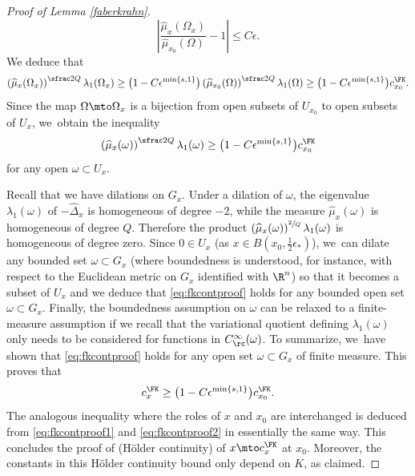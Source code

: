 \begin{proof}[Proof of Lemma \ref{faberkrahn}]
\begin{equation}
\label{eq:fkcontproof2}
\left| \frac{\widehat\mu_x(\Omega_x)}{\widehat\mu_{x_0}(\Omega)} - 1\right| \leq C \epsilon.
\end{equation}
We deduce that
\[
\left(\widehat\mu_x(\Omega_x)\right)^{\sfrac2Q} \lambda_1(\Omega_x)
\geq \bigl(1- C \epsilon^{\min\{s,1\}}\bigr) \left(\widehat\mu_{x_0}(\Omega)\right)^{\sfrac2Q} \lambda_1(\Omega) \geq \bigl(1- C \epsilon^{\min\{s,1\}}\bigr) c^\FK_{x_0}.
\]
Since the map $\Omega\mto\Omega_x$ is a bijection from open subsets of $U_{x_0}$ to open subsets of $U_x$, we~obtain the inequality
\begin{equation}
\label{eq:fkcontproof}
\left(\widehat\mu_x(\omega)\right)^{\sfrac2Q} \lambda_1(\omega)
\geq \bigl(1- C \epsilon^{\min\{s,1\}} \bigr) c^\FK_{x_0}
\end{equation}
for any open $\omega\subset U_x$.

Recall that we have dilations on $G_x$. Under a dilation of $\omega$, the eigenvalue $\lambda_1(\omega)$ of $-\widehat\Delta_x$ is homogeneous of degree $-2$, while the measure $\widehat\mu_x(\omega)$ is homogeneous of degree $Q$. Therefore the product $\left(\widehat\mu_x(\omega)\right)^{\sfrac2Q} \lambda_1(\omega)$ is homogeneous of degree zero. Since $0\in U_x$ (as $x\in B(x_0,\frac12\epsilon_*)$), we~can dilate any bounded set $\omega\subset G_x$ (where boundedness is understood, for instance, with respect to the Euclidean metric on $G_x$ identified with $\R^n$) so that it becomes a subset of $U_x$ and we deduce that \eqref{eq:fkcontproof} holds for any bounded open set $\omega\subset G_x$. Finally, the boundedness assumption on $\omega$ can be relaxed to a finite-measure assumption if we recall that the variational quotient defining $\lambda_1(\omega)$ only needs to be considered for functions in $C^\infty_\rc(\omega)$. To summarize, we~have shown that \eqref{eq:fkcontproof} holds for any open set $\omega\subset G_x$ of finite measure. This proves that
\[
c_x^\FK \geq \bigl(1- C \epsilon^{\min\{s,1\}} \bigr) c^\FK_{x_0}.
\]
The analogous inequality where the roles of $x$ and $x_0$ are interchanged is deduced from \eqref{eq:fkcontproof1} and \eqref{eq:fkcontproof2} in essentially the same way. This concludes the proof of (Hölder continuity) of $x\mto c^\FK_x$ at $x_0$. Moreover, the constants in this Hölder continuity bound only depend on $K$, as claimed.
\end{proof}

